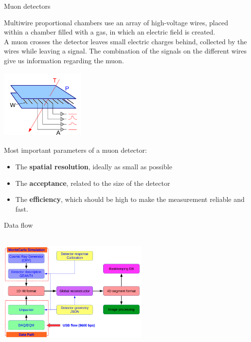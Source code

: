 \documentclass[8 pt]{beamer}
\begin{document}
\begin{frame}{Muon detectors}
\justifying
\begin{minipage}[c]{.58\textwidth}
\justifying
Multiwire proportional chambers use an array of high-voltage wires, placed within a chamber filled with a gas, in which an electric field is created. \\ \vspace{10pt}
A muon crosses the detector leaves small electric charges behind, collected by the wires while leaving a signal. The combination of the signals on the different wires give us information regarding the muon.
\end{minipage} \hfill
\begin{minipage}[c]{.39\textwidth}
\includegraphics[width=4.2cm, height=3.5cm]{figs/wireChambers.png}
\end{minipage} \hfill \vfill

Most important parameters of a muon detector:
\begin{itemize}
\justifying
\item The \textbf{spatial resolution}, ideally as small as possible
\item The \textbf{acceptance}, related to the size of the detector
\item The \textbf{efficiency}, which should be high to make the measurement reliable and fast.
\end{itemize}
\end{frame}

\begin{frame}{Data flow}
\begin{center}
\includegraphics[width=7.5cm, height=6cm]{figs/dataFlow.png}
\end{center}
\end{frame}
\end{document}
